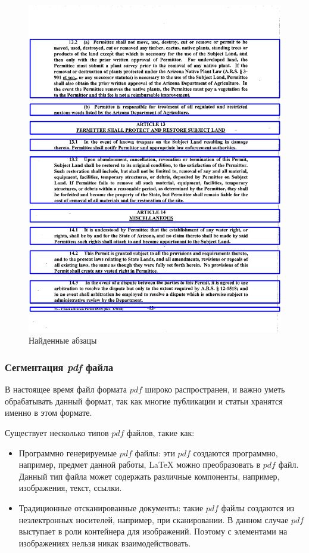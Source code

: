 \begin{figure}
    \includegraphics[scale=0.2]{img/paragraph/out.png}
    \caption{Найденные абзацы}
    \label{segmentation_output}
\end{figure}

\subsubsection{Сегментация \textit{pdf} файла}
В настоящее время файл формата $pdf$ широко распространен, и важно уметь обрабатывать данный формат, так как многие публикации и статьи хранятся именно в этом формате.

Существует несколько типов $pdf$ файлов, такие как:
\begin{itemize}
    \item Программно генерируемые $pdf$ файлы: эти $pdf$ создаются программно, например, предмет данной работы, \LaTeX\; можно преобразовать в $pdf$ файл. Данный тип файла может содержать различные компоненты, например, изображения, текст, ссылки.
    \item Традиционные отсканированные документы: такие $pdf$ файлы создаются из неэлектронных носителей, например, при сканировании. В данном случае $pdf$ выступает в роли контейнера для изображений. Поэтому с элементами на изображениях нельзя никак взаимодействовать.
\end{itemize}

